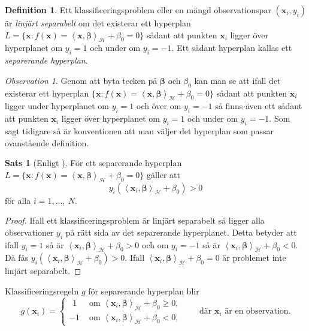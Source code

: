 \documentclass[a4paper, 12pt]{report}
\theoremstyle{definition}
\newtheorem{thm}{Sats}[section]
\newtheorem{defi}{Definition}[section]
\theoremstyle{remark}
\newtheorem*{rem}{Observation}
\newcommand{\bfbeta}{{\boldsymbol{\beta}}}
\newcommand{\bfx}{\mathbf{x}}
\newcommand{\llangle}{\left\langle}
\newcommand{\rrangle}{\right\rangle}
\newcommand{\sephyp}{\{ \mathbf{x} : f\left(\mathbf{x}\right)=\inner{\bfx}{\bfbeta}_\mathcal{H} + \beta_0=0\}}
\newcommand{\inner}[2]{\llangle #1, #2 \rrangle}
\newcommand{\hil}{\mathcal{H}}
\begin{document}
\begin{defi}
	Ett klassificeringsproblem eller en mängd observationspar $\left(\mathbf{x}_i, y_i\right)$ är \textit{linjärt separabelt} om det existerar ett hyperplan $L=\sephyp$ sådant att punkten $\bfx_i$ ligger över hyperplanet om $y_i=1$ och under om $y_i=-1$. Ett sådant hyperplan kallas ett \emph{separerande hyperplan}.
\end{defi}
\begin{rem}
	Genom att byta tecken på $\bfbeta$ och $\beta_0$ kan man se att ifall det existerar ett hyperplan $\sephyp$ sådant att punkten $\bfx_i$ ligger under hyperplanet om $y_i=1$ och över om $y_i=-1$ så finns även ett sådant att punkten $\bfx_i$ ligger över hyperplanet om $y_i=1$ och under om $y_i=-1$.
	Som sagt tidigare så är konventionen att man väljer det hyperplan som passar ovanstående definition.
\end{rem}
\begin{thm}[Enligt \cite{Boyd}]\label{thm:sephyppositive}
	För ett separerande hyperplan $L=\sephyp$ gäller att 
	\begin{equation*}
		y_i\left(\inner{\bfx_i}{\bfbeta}_\hil + \beta_0\right) > 0
	\end{equation*}
	för alla $i = 1, \dots,~N$.
\end{thm}
\begin{proof}
	Ifall ett klassificeringsproblem är linjärt separabelt så ligger alla observationer $y_i$ på rätt sida av det separerande hyperplanet. Detta betyder att ifall $y_i=1$ så är $\inner{\bfx_i}{\bfbeta}_\hil + \beta_0 > 0$ och om $y_i=-1$ så är $\inner{\bfx_i}{\bfbeta}_\hil + \beta_0 < 0$.
	Då fås $y_i\left(\inner{\bfx_i}{\bfbeta}_\hil + \beta_0\right) > 0$. Ifall $\inner{\bfx_i}{\bfbeta}_\hil + \beta_0 = 0$ är problemet inte linjärt separabelt.
\end{proof}

Klassificeringsregeln $g$ för separerande hyperplan blir
\begin{equation*}
g\left(\mathbf{x}_i\right)=  
\begin{cases}
~~ 1 &\text{ om } \inner{\bfx_i}{\bfbeta}_\hil + \beta_0 \geq 0,\\
-1 &\text{ om } \inner{\bfx_i}{\bfbeta}_\hil + \beta_0 < 0,
\end{cases}\qquad\text{där }\bfx_i\text{ är en observation.}
\end{equation*}
\end{document}
